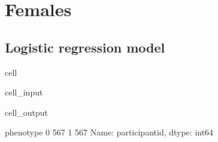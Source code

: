 \documentclass[letterpaper,10pt,english]{jupyterBook}
\begin{document}
\section{Females}
\label{\detokenize{Cooper:females}}

\subsection{Logistic regression model}
\label{\detokenize{Cooper:id4}}
\begin{sphinxuseclass}{cell}\begin{sphinxVerbatimInput}

\begin{sphinxuseclass}{cell_input}
\begin{sphinxVerbatim}[commandchars=\\\{\}]
  \PYG{p}{[}  \PYG{p}{]}
  \PYG{p}{[}\PYG{p}{[}\PYG{p}{]}\PYG{p}{]}
  \PYG{p}{[}\PYG{p}{]}
     
\PYG{p}{[}\PYG{p}{]}
\end{sphinxVerbatim}

\end{sphinxuseclass}\end{sphinxVerbatimInput}
\begin{sphinxVerbatimOutput}

\begin{sphinxuseclass}{cell_output}
\begin{sphinxVerbatim}[commandchars=\\\{\}]
phenotype
0    567
1    567
Name: participant\PYGZus{}id, dtype: int64
\end{sphinxVerbatim}

\end{sphinxuseclass}\end{sphinxVerbatimOutput}

\end{sphinxuseclass}
\end{document}
